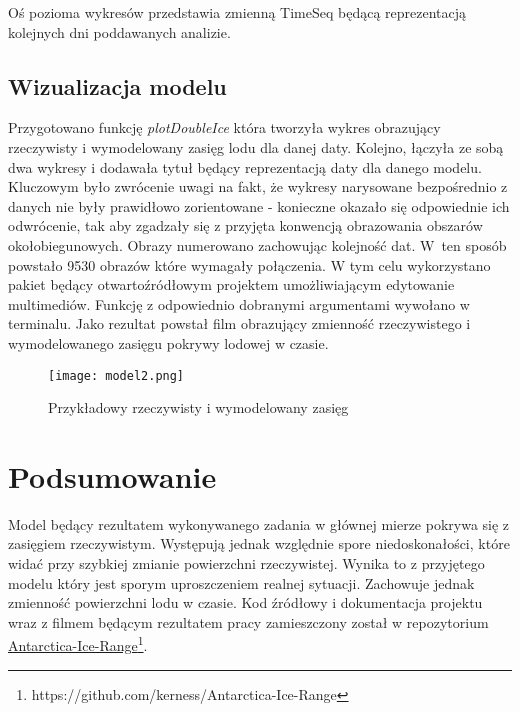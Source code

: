 \documentclass[letterpaper,12pt]{article}
\begin{document}
\noindent Oś pozioma wykresów przedstawia zmienną TimeSeq będącą reprezentacją kolejnych dni poddawanych analizie.

\subsection{Wizualizacja modelu}

Przygotowano funkcję \textit{plotDoubleIce} która tworzyła wykres obrazujący rzeczywisty i wymodelowany zasięg lodu dla danej daty. Kolejno, łączyła ze sobą dwa wykresy i dodawała tytuł będący reprezentacją daty dla danego modelu. Kluczowym było zwrócenie uwagi na fakt, że wykresy narysowane bezpośrednio z danych nie były prawidłowo zorientowane - konieczne okazało się odpowiednie ich odwrócenie, tak aby zgadzały się z przyjęta konwencją obrazowania obszarów okołobiegunowych. Obrazy numerowano zachowując kolejność dat. W~ten sposób powstało 9530 obrazów które wymagały połączenia. W tym celu wykorzystano pakiet  będący otwartoźródłowym projektem umożliwiającym edytowanie multimediów. Funkcję  z odpowiednio dobranymi argumentami wywołano w terminalu. Jako rezultat powstał film obrazujący zmienność rzeczywistego i wymodelowanego zasięgu pokrywy lodowej w czasie. 

\begin{figure}[ht]
        \centering \texttt{[image: model2.png]}
        \caption{
                \label{fig:samplesetup} 
                Przykładowy rzeczywisty i wymodelowany zasięg
        }
\end{figure}


\section{Podsumowanie}

Model będący rezultatem wykonywanego zadania w głównej mierze pokrywa się z zasięgiem rzeczywistym. Występują jednak względnie spore niedoskonałości, które widać przy szybkiej zmianie powierzchni rzeczywistej. Wynika to z przyjętego modelu który jest sporym uproszczeniem realnej sytuacji. Zachowuje jednak zmienność powierzchni lodu w czasie. Kod źródłowy i dokumentacja projektu wraz z filmem będącym rezultatem pracy zamieszczony został w repozytorium \href{https://github.com/kerness/Antarctica-Ice-Range}{Antarctica-Ice-Range\footnote{https://github.com/kerness/Antarctica-Ice-Range}}.

\end{document}
